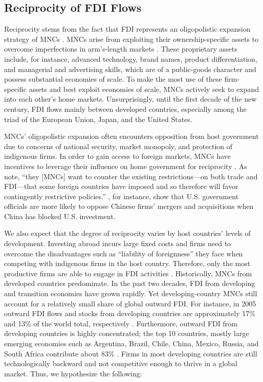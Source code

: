 \documentclass[12pt]{article}
\begin{document}
\subsection{Reciprocity of FDI Flows}
Reciprocity stems from the fact that FDI represents an oligopolistic expansion strategy of MNCs \citep{Hymer:1976,Kindleberger:1969}. MNCs arise from exploiting their ownership-specific assets to overcome imperfections in arm's-length markets \citep{Caves:1996,Dunning:1992}. These proprietary assets include, for instance, advanced technology, brand names, product differentiation, and managerial and advertising skills, which are of a public-goods character and possess substantial economies of scale. To make the most use of these firm-specific assets and best exploit economies of scale, MNCs actively seek to expand into each other's home markets. Unsurprisingly, until the first decade of the new century, FDI flows mainly between developed countries, especially among the triad of the European Union, Japan, and the United States.

MNCs' oligopolistic expansion often encounters opposition from host government due to concerns of national security, market monopoly, and protection of indigenous firms. In order to gain access to foreign markets, MNCs have incentives to leverage their influence on home government for reciprocity \citep{Milner:1988,Crystal:2003}. As \citet[6]{Crystal:2003} note, ``they [MNCs] want to counter the existing restrictions---on both trade and FDI---that some foreign countries have imposed and so therefore will favor contingently restrictive policies.'' \citet{Tingley:2015}, for instance, show that U.S. government officials are more likely to oppose Chinese firms' mergers and acquisitions when China has blocked U.S. investment.

We also expect that the degree of reciprocity varies by host countries' levels of development. Investing abroad incurs large fixed costs and firms need to overcome the disadvantages such as ``liability of foreignness'' they face when competing with indigenous firms in the host country. Therefore, only the most productive firms are able to engage in FDI activities \citep{Melitz:2003,Helpman_et_al:2004}. Historically, MNCs from developed countries predominate. In the past two decades, FDI from developing and transition economies have grown rapidly. Yet developing-country MNCs still account for a relatively small share of global outward FDI. For instance, in 2005 outward FDI flows and stocks from developing countries are approximately 17\% and 13\% of the world total, respectively \citep{UNCTAD:2006}. Furthermore, outward FDI from developing countries is highly concentrated; the top 10 countries, mostly large emerging economies such as Argentina, Brazil, Chile, China, Mexico, Russia, and South Africa contribute about 83\% \citep{UNCTAD:2006}. Firms in most developing countries are still technologically backward and not competitive enough to thrive in a global market. Thus, we hypothesize the following:
\end{document}
